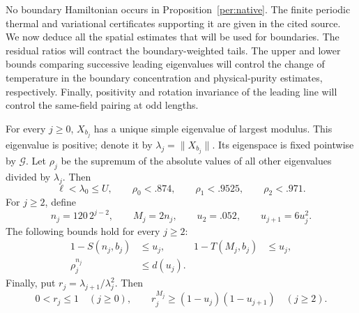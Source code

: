 No boundary Hamiltonian occurs in Proposition~\ref{per:native}.
The finite periodic thermal and variational certificates supporting it
are given in the cited source.  We now deduce all the spatial estimates
that will be used for boundaries. The residual ratios will contract
the boundary-weighted tails. The upper and lower bounds comparing
successive leading eigenvalues will control the change of temperature
in the boundary concentration and physical-purity estimates,
respectively. Finally, positivity and rotation invariance of the
leading line will control the same-field pairing at odd lengths.

\begin{proposition}
\label{per:concentration}
For every $j\ge0$, $X_{b_j}$ has a unique simple eigenvalue of largest
modulus.  This eigenvalue is positive; denote it by
$\lambda_j=\|X_{b_j}\|$.  Its eigenspace is fixed pointwise by
$\mathcal G$.  Let $\rho_j$ be the supremum of the absolute values of
all other eigenvalues divided by $\lambda_j$.  Then
\begin{equation}\label{per:initial-ratios}
 \ell<\lambda_0\le U,\qquad
 \rho_0<.874,\qquad \rho_1<.9525,\qquad \rho_2<.971.
\end{equation}
For $j\ge2$, define
\begin{equation}\label{per:scales}
 n_j=120\,2^{j-2},\qquad M_j=2n_j,\qquad
 u_2=.052,\qquad u_{j+1}=6u_j^2.
\end{equation}
The following bounds hold for every $j\ge2$:
\begin{align}
 1-S(n_j,b_j)&\le u_j,&
 1-T(M_j,b_j)&\le u_j, \label{per:tracked-purities}\\
 \rho_j^{n_j}&\le d(u_j). &&\label{per:spectral-ratio}
\end{align}
Finally, put $r_j=\lambda_{j+1}/\lambda_j^2$.  Then
\begin{equation}\label{per:lambda-ratios}
 0<r_j\le1\quad(j\ge0),\qquad
 r_j^{M_j}\ge(1-u_j)(1-u_{j+1})\quad(j\ge2).
\end{equation}
\end{proposition}

